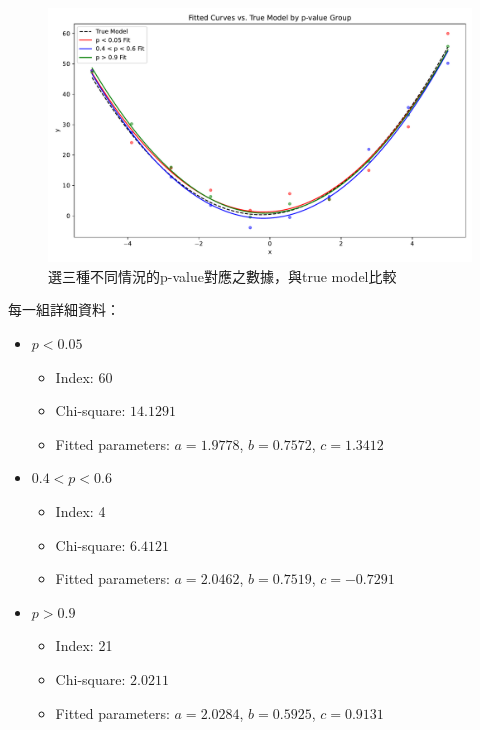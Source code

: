 \documentclass[12pt,a4paper]{article}
\begin{document}
\begin{CJK}{UTF8}{bkai}
\clearpage

\begin{figure}[h]
    \centering
    \includegraphics[width=1\linewidth]{figures/RF/output1_5.pdf}
    \caption{選三種不同情況的p-value對應之數據，與true model比較}
    \label{fig:enter-label}
\end{figure}

每一組詳細資料：
\begin{itemize}
    \item $p < 0.05$
    \begin{itemize}
        \item Index: 60
        \item Chi-square: $14.1291$
        \item Fitted parameters: $a = 1.9778$, $b = 0.7572$, $c = 1.3412$
    \end{itemize}
    \item $0.4 < p < 0.6$
    \begin{itemize}
        \item Index: 4
        \item Chi-square: $6.4121$
        \item Fitted parameters: $a = 2.0462$, $b = 0.7519$, $c = -0.7291$
    \end{itemize}
    \item $p > 0.9$
    \begin{itemize}
        \item Index: 21
        \item Chi-square: $2.0211$
        \item Fitted parameters: $a = 2.0284$, $b = 0.5925$, $c = 0.9131$
    \end{itemize}
\end{itemize}


\end{CJK}
\end{document}
